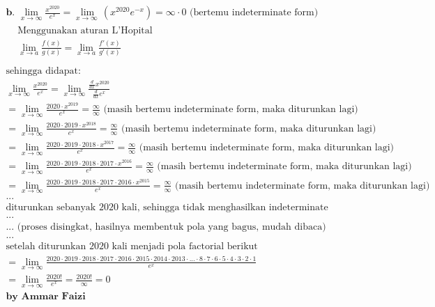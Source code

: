 \documentclass[12pt]{article}
\begin{document}
\begin{fleqn}[1em]
\begin{align*}
\boxed{
\begin{aligned}
  & \textbf{b. } \lim_{x \to \infty} \frac{x^{2020}}{e^x}
    = \lim_{x\to \infty \:}\left(x^{2020}e^{-x}\right)
    = \infty \cdot 0 \text{ (bertemu indeterminate form)} \\
  & \boxed{
    \begin{aligned}
      & \text{Menggunakan aturan L'Hopital} \\
      & \lim_{x \to a} \frac{f(x)}{g(x)} = \lim_{x \to a} \frac{f'(x)}{g'(x)} \\
    \end{aligned}
  } \\
  & \text{sehingga didapat: } \\
  & \lim_{x \to \infty} \frac{x^{2020}}{e^x}
    = \lim_{x \to \infty} \frac{\frac{d}{dx} x^{2020}}{\frac{d}{dx} e^x} \\
  & = \lim _{x\to \infty}\frac{2020 \cdot x^{2019}}{e^x} = \frac{\infty}{\infty}
    \text{ (masih bertemu indeterminate form, maka diturunkan lagi)} \\
  & = \lim _{x\to \infty}\frac{2020 \cdot 2019 \cdot x^{2018}}{e^x} = \frac{\infty}{\infty}
    \text{ (masih bertemu indeterminate form, maka diturunkan lagi)} \\
  & = \lim _{x\to \infty}\frac{2020 \cdot 2019 \cdot 2018 \cdot  x^{2017}}{e^x} = \frac{\infty}{\infty}
    \text{ (masih bertemu indeterminate form, maka diturunkan lagi)} \\
  & = \lim _{x\to \infty}\frac{2020 \cdot 2019 \cdot 2018 \cdot 2017 \cdot x^{2016}}{e^x} = \frac{\infty}{\infty}
    \text{ (masih bertemu indeterminate form, maka diturunkan lagi)} \\
  & = \lim _{x\to \infty}\frac{2020 \cdot 2019 \cdot 2018 \cdot 2017 \cdot 2016 \cdot x^{2015}}{e^x} = \frac{\infty}{\infty}
    \text{ (masih bertemu indeterminate form, maka diturunkan lagi)} \\
  & ... \\
  & \text{diturunkan sebanyak 2020 kali, sehingga tidak menghasilkan indeterminate form lagi} \\
  & ... \\
  & ... \text{ (proses disingkat, hasilnya membentuk pola yang bagus, mudah dibaca)} \\
  & ... \\
  & \text{setelah diturunkan 2020 kali menjadi pola factorial berikut} \\
  & = \lim _{x\to \infty}\frac{
    2020 \cdot 2019 \cdot 2018 \cdot 2017 \cdot 2016 \cdot
    2015 \cdot 2014 \cdot 2013 \cdot ... \cdot
    8 \cdot 7 \cdot 6 \cdot 5 \cdot 4 \cdot 3 \cdot 2 \cdot 1
  }{e^x} \\
  & = \lim _{x\to \infty}\frac{2020!}{e^x} = \frac{2020!}{\infty} = 0
  \\ & \textbf{by Ammar Faizi}
\end{aligned}
}
\end{align*}


\end{fleqn}
\end{document}
